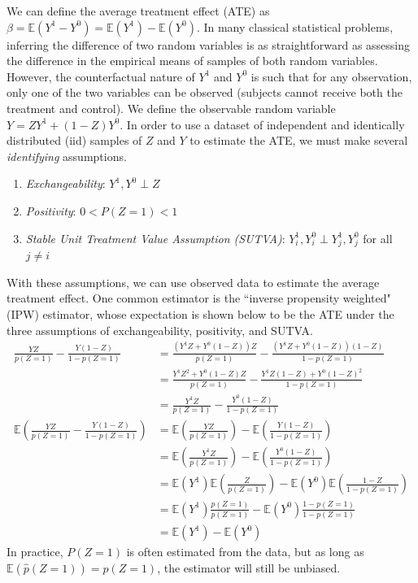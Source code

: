 \documentclass[11pt,  dvipsnames, table, x11name]{article}
\newcommand\E[1]{\mathbb{E}\left(#1\right)}
\begin{document}
	We can define the average treatment effect (ATE) as $\beta = \E{Y^1 - Y^0} = \E{Y^1} - \E{Y^0}$. 
	In many classical statistical problems, inferring the difference of two random variables is as 
	straightforward as assessing the difference in the empirical means of samples of both random variables. 
	However, the counterfactual nature of $Y^1$ and $Y^0$ is such that for any observation, only one of the two 
	variables can be observed (subjects cannot receive both the treatment and control). We define the 
	observable random variable $Y = ZY^1 + (1 - Z)Y^0$. In order to use a dataset of independent and identically 
	distributed (iid) samples of $Z$ and $Y$ to estimate the ATE, we must make several \textit{identifying} 
	assumptions.
	\begin{enumerate}
		\item \textit{Exchangeability}: $Y^1, Y^0 \perp Z$
		\item \textit{Positivity}: $0 < P(Z = 1) < 1$
		\item \textit{Stable Unit Treatment Value Assumption (SUTVA)}: $Y_i^1, Y_i^0 \perp Y_j^1, Y_j^0$ for all $j \neq i$
	\end{enumerate}
	With these assumptions, we can use observed data to estimate the average treatment effect. 
	One common estimator is the ``inverse propensity weighted" (IPW) estimator, whose expectation is shown below to 
	be the ATE under the three assumptions of exchangeability, positivity, and SUTVA.
	\begin{align*}
		\frac{YZ}{p(Z = 1)} - \frac{Y(1-Z)}{1 - p(Z = 1)} &= \frac{\left(Y^1Z + Y^0(1 - Z)\right)Z}{p(Z = 1)} - \frac{\left(Y^1Z + Y^0(1 - Z)\right)(1-Z)}{1 - p(Z = 1)}\\
		&= \frac{Y^1Z^2 + Y^0(1 - Z)Z}{p(Z = 1)} - \frac{Y^1Z(1-Z) + Y^0(1 - Z)^2}{1 - p(Z = 1)}\\
		&= \frac{Y^1Z}{p(Z = 1)} - \frac{Y^0(1 - Z)}{1 - p(Z = 1)}\\
		\E{\frac{YZ}{p(Z = 1)} - \frac{Y(1-Z)}{1 - p(Z = 1)}} &= \E{\frac{YZ}{p(Z = 1)}} - \E{\frac{Y(1-Z)}{1 - p(Z = 1)}}\\
		&= \E{\frac{Y^1Z}{p(Z = 1)}} - \E{\frac{Y^0(1-Z)}{1 - p(Z = 1)}}\\
		&= \E{Y^1}\E{\frac{Z}{p(Z = 1)}} - \E{Y^0}\E{\frac{1-Z}{1 - p(Z = 1)}}\\
		&= \E{Y^1}\frac{p(Z = 1)}{p(Z = 1)} - \E{Y^0}\frac{1-p(Z = 1)}{1 - p(Z = 1)}\\
		&= \E{Y^1} - \E{Y^0}
	\end{align*}
	In practice, $P(Z = 1)$ is often estimated from the data, but as long as $\E{\hat{p}(Z = 1)} = p(Z = 1)$, the 
	estimator will still be unbiased.
	
\end{document}
